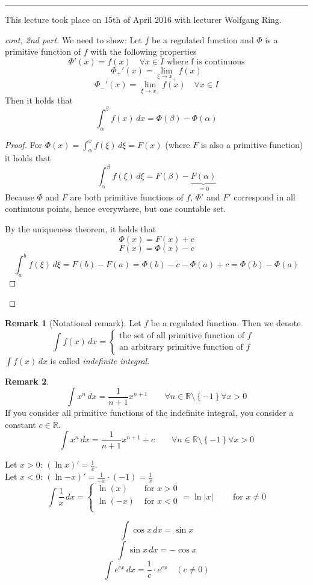 \documentclass[a4paper,landscape,twocolumn]{article}
\theoremstyle{definition}
\newtheorem{rem}{Remark}
\newcommand\set[1]{\left\{#1\right\}}
\newcommand\abs[1]{\left|#1\right|}
\newcommand\meta[3]{\hrule{} This #1 took place on #2 with lecturer #3.\par}
\begin{document}
\meta{lecture}{15th of April 2016}{Wolfgang Ring}

\begin{proof}[cont, 2nd part]
  We need to show: Let $f$ be a regulated function and $\Phi$ is a
  primitive function of $f$ with the following properties
  \[ \Phi'(x) = f(x) \quad \forall x \in I \text{ where f is continuous} \]
  \[ \Phi_+'(x) = \lim_{\xi\to x_+} f(x) \]
  \[ \Phi_-'(x) = \lim_{\xi\to x_-} f(x) \quad \forall x \in I \]
  Then it holds that
  \[ \int_\alpha^\beta f(x) \, dx = \Phi(\beta) - \Phi(\alpha) \]

  \begin{proof}
    For $\Phi(x) = \int_\alpha^x f(\xi) \, d\xi = F(x)$ (where $F$ is also a primitive function)
    it holds that
    \[ \int_\alpha^\beta f(\xi) \, d\xi = F(\beta) - \underbrace{F(\alpha)}_{=0} \]
    Because $\Phi$ and $F$ are both primitive functions of $f$,
    $\Phi'$ and $F'$ correspond in all continuous points,
    hence everywhere, but one countable set.

    By the uniqueness theorem, it holds that
    \[ \Phi(x) = F(x) + c \]
    \[ F(x) = \Phi(x) - c \]
    \[ \int_a^b f(\xi)\, d\xi = F(b) - F(a) = \Phi(b) - c - \Phi(a) + c = \Phi(b) - \Phi(a) \]
  \end{proof}
\end{proof}

\begin{rem}[Notational remark]
  Let $f$ be a regulated function. Then we denote
  \[
    \int f(x) \, dx =
    \begin{cases}
      \text{the set of all primitive function of } f & \\
      \text{an arbitrary primitive function of } f
    \end{cases}
  \]
  $\int f(x) \, dx$ is called \emph{indefinite integral}.
\end{rem}

\begin{rem}
  \[
    \int x^n \, dx = \frac{1}{n+1} x^{n+1}
    \qquad \forall n \in \mathbb R \setminus \set{-1} \forall x > 0
  \]
  If you consider all primitive functions of the indefinite integral,
  you consider a constant $c \in \mathbb R$.
  \[
    \int x^n \, dx = \frac{1}{n+1} x^{n+1} + c
    \qquad \forall n \in \mathbb R \setminus \set{-1} \forall x > 0
  \]

  Let $x > 0$: $(\ln{x})' = \frac1x$. \\
  Let $x < 0$: $(\ln{-x})' = \frac1{-x} \cdot (-1) = \frac1x$
  \[
    \int \frac 1x \, dx = \begin{cases}
      \ln(x)  & \text{ for } x > 0 \\
      \ln(-x) & \text{ for } x < 0 \\
    \end{cases}
    = \ln{\abs{x}} \qquad \text{ for } x \neq 0
  \]

  \[ \int \cos{x} \, dx = \sin{x} \]
  \[ \int \sin{x} \, dx = -\cos{x} \]
  \[ \int e^{cx} \, dx = \frac1c \cdot e^{cx} \quad (c \neq 0) \]
\end{rem}
\end{document}
